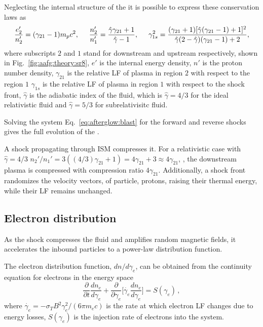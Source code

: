 Neglecting the internal structure of the \blast{} it is possible to express 
these conservation laws as \citep{Blandford:1976,Rezzolla:2013} 
\begin{equation}
\frac{e_2'}{n_2'} = (\gamma_{21} - 1)m_p c^2, \hspace{5mm}
\frac{n_2'}{n_1'} = \frac{\hat{\gamma}\gamma_{21} + 1}{\hat{\gamma}-1}, \hspace{5mm}
\gamma_{1s}^2 = \frac{(\gamma_{21} + 1) [\hat{\gamma}(\gamma_{21}-1)+1]^2}{\hat{\gamma}(2-\hat{\gamma})(\gamma_{21}-1)+2},
\label{eq:afterglow:blast}
\end{equation}
where subscripts $2$ and $1$ stand for downstream and upstream respectively, 
shown in Fig.~\ref{fig:aafg:theory:sr8}, 
$e'$ is the internal energy density, $n'$ is the proton number density, 
$\gamma_{21}$ is the relative \ac{LF} of plasma in region 
$2$ with respect to the region $1$
$\gamma_{1s}$ is the relative \ac{LF} of plasma in region $1$ with respect to the shock front,
$\hat{\gamma}$ is the adiabatic index of the fluid, which is $\hat{\gamma}=4/3$ 
for the ideal relativistic fluid and $\hat{\gamma}=5/3$ for subrelativisitc fluid.

Solving the system Eq.~\eqref{eq:afterglow:blast} for the 
forward and reverse shocks gives the full evolution of the \blast{}. 

A shock propagating through \ac{ISM} compresses it. For a relativistic case with $\hat{\gamma}=4/3$
$n_2'/n_1' = 3 ((4/3)\gamma_{21} + 1) = 4\gamma_{21} + 3 \approx 4 \gamma_{21}$, 
\ie, the downstream plasma is compressed with compression ratio $4\gamma_{21}$.
%
Additionally, a shock front randomizes the velocity vectors,
of particle, protons, raising their thermal energy, while their \ac{LF} remains
unchanged.


\subsection{Electron distribution}

As the shock compresses the fluid and amplifies random magnetic fields, it accelerates the 
inbound particles to a power-law distribution function. 

The electron distribution function, $dn/d\gamma_e$, can be obtained from 
the continuity equation for electrons in the energy space 
%
\begin{equation}
\label{eq:intro:electron_dist_cont_eq}
\frac{\partial }{\partial t}\frac{d n_e}{d\gamma_e} + \frac{\partial}{\partial \gamma_e}\Big[ \dot{\gamma_e}\frac{dn_e}{d\gamma_e} \Big] = S(\gamma_e)\, ,
\end{equation}
%
where $\dot{\gamma_e} = -\sigma_T B^2 \gamma_e^2 / (6\pi m_e c)$ is the rate at 
which electron \ac{LF} changes due to energy losses, $S(\gamma_e)$ is the injection 
rate of electrons into the system.


